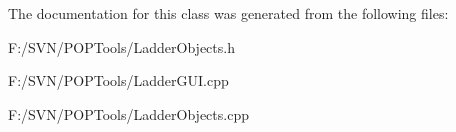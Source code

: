 The documentation for this class was generated from the following files\-:\begin{DoxyCompactItemize}
\item 
F\-:/\-S\-V\-N/\-P\-O\-P\-Tools/Ladder\-Objects.\-h\item 
F\-:/\-S\-V\-N/\-P\-O\-P\-Tools/Ladder\-G\-U\-I.\-cpp\item 
F\-:/\-S\-V\-N/\-P\-O\-P\-Tools/Ladder\-Objects.\-cpp\end{DoxyCompactItemize}
